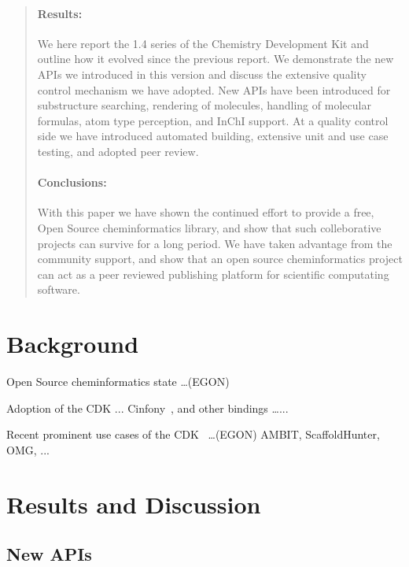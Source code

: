 \documentclass[10pt]{bmc_article}
\newenvironment{bmcformat}{\begin{raggedright}\baselineskip20pt\sloppy\setboolean{publ}{false}}{\end{raggedright}\baselineskip20pt\sloppy}
\begin{document}
\begin{bmcformat}
\begin{abstract}
\paragraph*{Results:}
We here report the 1.4 series of the Chemistry Development Kit and outline how
it evolved since the previous report. We demonstrate the new APIs we introduced
in this version and discuss the extensive quality control mechanism we have
adopted. New APIs have been introduced for substructure searching, rendering of
molecules, handling of molecular formulas, atom type perception, and InChI
support. At a quality control side we have introduced automated building,
extensive unit and use case testing, and adopted peer review.
\paragraph*{Conclusions:}
With this paper we have shown the continued effort to provide a free, Open Source
cheminformatics library, and show that such colleborative projects can survive for
a long period. We have taken advantage from the community support, and show
that an open source cheminformatics project can act as a peer reviewed
publishing platform for scientific computating software.
\end{abstract}




\section*{Background}

Open Source cheminformatics state \ldots (EGON)

Adoption of the CDK ... Cinfony~\cite{OBoyle2008}, and other bindings \ldots ...

Recent prominent use cases of the CDK~\cite{Steinbeck2003,Steinbeck2006} \ldots (EGON)
AMBIT, ScaffoldHunter, OMG, ...

 
\section*{Results and Discussion}

\subsection*{New APIs}


\end{bmcformat}
\end{document}
